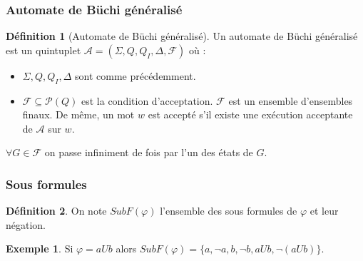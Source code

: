\documentclass{beamer}
\theoremstyle{plain}
\theoremstyle{definition}
\newtheorem{defi}{Définition}
\newtheorem{ex}{Exemple}
\begin{document}
\begin{frame}
  \frametitle{Automate de Büchi généralisé}
  
  \begin{defi}[Automate de Büchi généralisé]
    Un automate de Büchi généralisé est un quintuplet $\mathcal{A}=(\Sigma, Q, Q_I, \Delta, \mathscr{F})$ où :
    \begin{itemize}
    \item $\Sigma, Q, Q_I, \Delta$ sont comme précédemment.
    \item $\mathscr{F} \subseteq \mathcal{P}(Q)$ est la condition d'acceptation.
      $\mathscr{F}$ est un ensemble d'ensembles finaux. De même, un mot $w$ est accepté s'il existe une exécution acceptante de $\mathcal{A}$ sur $w$.
    \end{itemize}  
  \end{defi}

  $\forall G \in \mathscr{F}$ on passe infiniment de fois par l'un des états de $G$.
\end{frame}


\begin{frame}[<+->]
  \frametitle{Sous formules}
  
  \begin{defi}
    On note $SubF(\varphi)$ l'ensemble des sous formules de $\varphi$ et leur négation.
  \end{defi}

  \begin{ex}
    Si $\varphi = a U b$ alors $SubF(\varphi) = \{ a, \lnot a, b, \lnot b, a U b, \lnot(a U b)\}$.
  \end{ex}
\end{frame}
\end{document}
